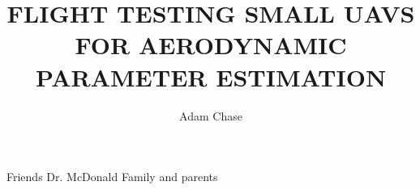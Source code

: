 \documentclass[12pt]{ucthesis}
\title{FLIGHT TESTING SMALL UAVS FOR AERODYNAMIC PARAMETER ESTIMATION}
\author{Adam Chase}
\begin{document}
\maketitle

\begin{frontmatter}
	
	\copyrightpage
	\committeemembershippage

\begin{abstract}


\end{abstract}

\begin{acknowledgements}
Friends
Dr. McDonald
Family and parents
\end{acknowledgements}


\tableofcontents


\listoftables

\listoffigures

\end{frontmatter}

\pagestyle{plain}


\renewcommand{\baselinestretch}{1.66}











%



\clearpage
\begin{appendices}



%
%

%
\end{appendices}


\clearpage



\end{document}
